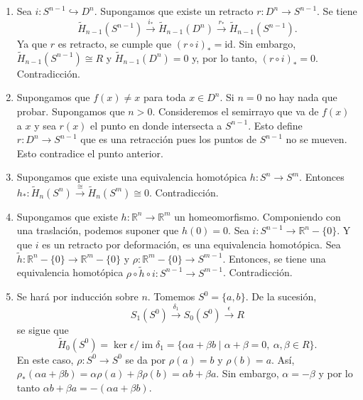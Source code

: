 \documentclass[11pt,a4paper]{article}
\theoremstyle{plain}
\theoremstyle{definition}
\theoremstyle{remark}
\newcommand{\RR}{\mathbb R}
\DeclareMathOperator{\im}{im}
\begin{document}
\begin{enumerate}[label=\arabic*.,leftmargin=*]
\begin{enumerate}[label=\alph*)]
Ahora, consideremos la sucesión de homología reducida para $(S^n,S^n_-)$:
\[
\cdots\to0=\tilde H_q(S^n_-)\to\tilde H_q(S^n)\xrightarrow{\cong}H_q(S^n,S^n_-)\xrightarrow{\hat\partial_q}\tilde H_{q-1}(S^n_-)=0\to\cdots
\]
Combinando, se tienen los isomorfismos:
\[
\tilde H_q(S^n)\xrightarrow{i_*}H_q(S^n,S^n_-)\xleftarrow{j_*}H_q(S^n_+,S^{n-1})\xrightarrow{\pi_*}H_q(D^n,S^{n-1})\xrightarrow{\hat\delta_q}\tilde H_{q-1}(S^{n-1})
\]
en donde $\pi_*$ es isomorfismo porque $\pi$ es homeomorfismo. Continuemos
por inducción sobre $n$. En primer lugar $S^0=\{a,b\}$, y por el Teorema de
escisión~\ref{thm:escision}, escindiendo a $U=\{b\}$,
\[
\tilde H_q(S^0)=H_q(S^0,\{b\})\cong H_q(\{a\})=\begin{cases}R & q=0\\0 & q\ne0.\end{cases}
\]
Supongamos que se tiene la homología de $S^{n-1}$. Usando el isomorfismo de
suspensión $\tilde H_q(S^n)\cong\tilde H_{q-1}(S^{n-1})$.
\item Sea $i:S^{n-1}\hookrightarrow D^n$. Supongamos que existe un retracto
$r:D^n\to S^{n-1}$. Se tiene
\[
\tilde H_{n-1}(S^{n-1})\xrightarrow{i_*}\tilde H_{n-1}(D^n)\xrightarrow{r_*}\tilde H_{n-1}(S^{n-1}).
\]
Ya que $r$ es retracto, se cumple que $(r\circ i)_*=\mathrm{id}$. Sin
embargo, $\tilde H_{n-1}(S^{n-1})\cong R$ y $\tilde H_{n-1}(D^n)=0$ y, por
lo tanto, $(r\circ i)_*=0$. Contradicción.
\item Supongamos que $f(x)\ne x$ para toda $x\in D^n$. Si $n=0$ no hay nada
que probar. Supongamos que $n>0$. Consideremos el semirrayo que va de
$f(x)$ a $x$ y sea $r(x)$ el punto en donde intersecta a $S^{n-1}$. Esto
define $r:D^n\to S^{n-1}$ que es una retracción pues los puntos de
$S^{n-1}$ no se mueven. Esto contradice el punto anterior.
\item Supongamos que existe una equivalencia homotópica $h:S^n\to S^m$.
Entonces $h_*:\tilde H_n(S^n)\overset{\cong}{\to}\tilde H_n(S^m)\cong0$.
Contradicción.
\item Supongamos que existe $h:\RR^n\to\RR^m$ un homeomorfismo. Componiendo
con una traslación, podemos suponer que $h(0)=0$. Sea $i:S^{n-1}\to\RR^n-\{0\}$.
Y que $i$ es un retracto por deformación, es una equivalencia homotópica.
Sea $\tilde h:\RR^n-\{0\}\to\RR^m-\{0\}$ y $\rho:\RR^m-\{0\}\to S^{m-1}$.
Entonces, se tiene una equivalencia homotópica $\rho\circ\tilde h\circ i:S^{n-1}\to S^{m-1}$.
Contradicción.
\item Se hará por inducción sobre $n$. Tomemos $S^0=\{a,b\}$. De la
sucesión,
\[
S_1(S^0)\xrightarrow{\delta_1}S_0(S^0)\xrightarrow{\epsilon}R
\]
se sigue que
\[
\tilde H_0(S^0)=\ker\epsilon/\im\delta_1=\{\alpha a+\beta b\mid\alpha+\beta=0,\ \alpha,\beta\in R\}.
\]
En este caso, $\rho:S^0\to S^0$ se da por $\rho(a)=b$ y $\rho(b)=a$. Así,
$\rho_*(\alpha a+\beta b)=\alpha\rho(a)+\beta\rho(b)=\alpha b+\beta a$. Sin
embargo, $\alpha=-\beta$ y por lo tanto $\alpha b+\beta a=-(\alpha a+\beta b)$.


\end{enumerate}
\end{enumerate}
\end{document}
